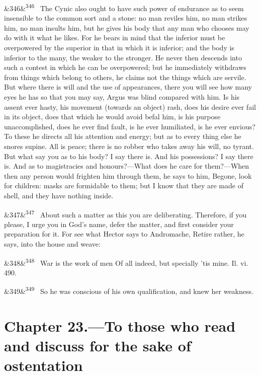 \documentclass[12pt]{article}
\newcommand{\para}[1][]{\par\noindent\ifx&#1&\else\textsuperscript{\footnotesize #1}~\fi}
\begin{document}
\para[346] The Cynic also ought to have such power of endurance as to seem insensible to the common sort and a stone: no man reviles him, no man strikes him, no man insults him, but he gives his body that any man who chooses may do with it what he likes. For he bears in mind that the inferior must be overpowered by the superior in that in which it is inferior; and the body is inferior to the many, the weaker to the stronger. He never then descends into such a contest in which he can be overpowered; but he immediately withdraws from things which belong to others, he claims not the things which are servile. But where there is will and the use of appearances, there you will see how many eyes he has so that you may say, Argus was blind compared with him. Is his assent ever hasty, his movement (towards an object) rash, does his desire ever fail in its object, does that which he would avoid befal him, is his purpose unaccomplished, does he ever find fault, is he ever humiliated, is he ever envious? To these he directs all his attention and energy; but as to every thing else he snores supine. All is peace; there is no robber who takes away his will, no tyrant. But what say you as to his body? I say there is. And his possessions? I say there is. And as to magistracies and honours?—What does he care for them?—When then any person would frighten him through them, he says to him, Begone, look for children: masks are formidable to them; but I know that they are made of shell, and they have nothing inside.

\para[347] About such a matter as this you are deliberating. Therefore, if you please, I urge you in God's name, defer the matter, and first consider your preparation for it. For see what Hector says to Andromache, Retire rather, he says, into the house and weave:

\para[348] War is the work of men Of all indeed, but specially 'tis mine. Il. vi. 490.

\para[349] So he was conscious of his own qualification, and knew her weakness.

\section*{Chapter 23.---To those who read and discuss for the sake of ostentation}
\end{document}
